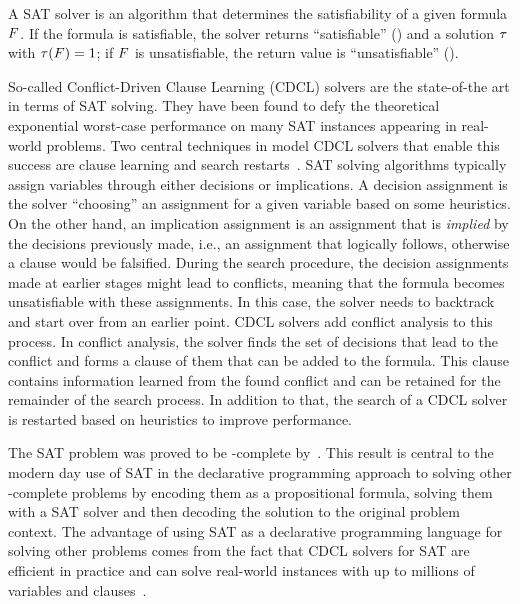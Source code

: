 A SAT solver is an algorithm that determines the satisfiability of a given formula $F$.
If the formula is satisfiable, the solver returns ``satisfiable'' (\sat{}) and a solution $\tau$ with $\tau(F)=1$;
if $F$ is unsatisfiable, the return value is ``unsatisfiable'' (\unsat{}).

So-called Conflict-Driven Clause Learning (CDCL) solvers are the state-of-the art in terms of SAT solving.
They have been found to defy the theoretical exponential worst-case performance on many SAT instances appearing in real-world problems.
Two central techniques in model CDCL solvers that enable this success are clause learning and search restarts~\autocite{handbook2-cdcl}.
SAT solving algorithms typically assign variables through either decisions or implications.
A decision assignment is the solver ``choosing'' an assignment for a given variable based on some heuristics.
On the other hand, an implication assignment is an assignment that is \emph{implied} by the decisions previously made, i.e., an assignment that logically follows, otherwise a clause would be falsified.
During the search procedure, the decision assignments made at earlier stages might lead to conflicts, meaning that the formula becomes unsatisfiable with these assignments.
In this case, the solver needs to backtrack and start over from an earlier point.
CDCL solvers add conflict analysis to this process.
In conflict analysis, the solver finds the set of decisions that lead to the conflict and forms a clause of them that can be added to the formula.
This clause contains information learned from the found conflict and can be retained for the remainder of the search process.
In addition to that, the search of a CDCL solver is restarted based on heuristics to improve performance.

The SAT problem was proved to be \NP-complete by~\textcite{DBLP:conf/stoc/Cook71}.
This result is central to the modern day use of SAT in the declarative programming approach to solving other \NP-complete problems by encoding them as a propositional formula, solving them with a SAT solver and then decoding the solution to the original problem context.
The advantage of using SAT as a declarative programming language for solving other problems comes from the fact that CDCL solvers for SAT are efficient in practice and can solve real-world instances with up to millions of variables and clauses~\autocite{handbook2-cdcl}.

